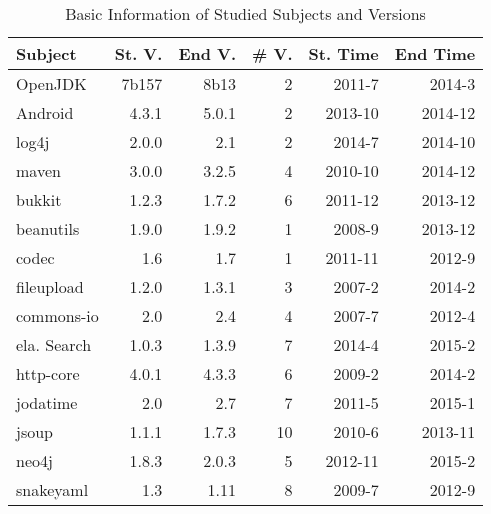 \begin{table}
	\center 
	\caption{\label{table:basicInfo} Basic Information of Studied Subjects and Versions}
	\begin{tabular}{|l|r|r|r|r|r|}
		\hline 
	      	Subject & St. V.& End V. & \# V.  & St. Time & End Time \\
    		\hline 
			OpenJDK & 7b157 & 8b13 & 2 &  2011-7 & 2014-3 \\
			Android & 4.3.1 & 5.0.1 & 2 &  2013-10 & 2014-12\\
			log4j & 2.0.0 & 2.1 &2 & 2014-7& 2014-10\\
			maven & 3.0.0 & 3.2.5 & 4& 2010-10& 2014-12\\
			bukkit &  1.2.3& 1.7.2 & 6& 2011-12 & 2013-12\\
			beanutils & 1.9.0 & 1.9.2 & 1 &  2008-9 & 2013-12\\
			codec & 1.6 & 1.7 & 1 &  2011-11 & 2012-9\\
			fileupload & 1.2.0 & 1.3.1 & 3 & 2007-2 & 2014-2\\
			commons-io & 2.0 & 2.4  & 4 & 2007-7& 2012-4\\
			ela. Search & 1.0.3 & 1.3.9 & 7& 2014-4& 2015-2\\
			http-core & 4.0.1 & 4.3.3 & 6& 2009-2 & 2014-2\\
			jodatime & 2.0  & 2.7 & 7 & 2011-5& 2015-1\\
			jsoup & 1.1.1 &1.7.3  & 10& 2010-6& 2013-11\\
			neo4j & 1.8.3 & 2.0.3 & 5&  2012-11& 2015-2\\
			snakeyaml & 1.3 & 1.11 & 8 &  2009-7 &2012-9\\
			\hline
	\end{tabular}
	\vspace{1cm}
\end{table}

